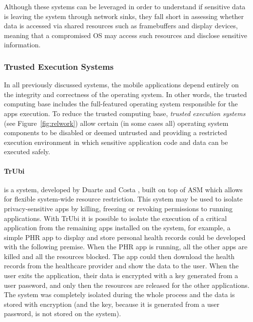 Although these systems can be leveraged in order to understand if sensitive data is leaving the system through network sinks, they fall short in assessing whether data is accessed via shared resources such as framebuffers and display devices, meaning that a compromised OS may access such resources and disclose sensitive information.

\subsubsection{Trusted Execution Systems}
\label{sec:tee}

In all previously discussed systems, the mobile applications depend entirely on the integrity and correctness of the operating system. In other words, the trusted computing base includes the full-featured operating system responsible for the apps execution. To reduce the trusted computing base, \emph{trusted execution systems} (see Figure~\ref{fig:relwork}) allow certain (in some cases all) operating system components to be disabled or deemed untrusted and providing a restricted execution environment in which sensitive application code and data can be executed safely.

\paragraph{\textbf{TrUbi}} is a system, developed by Duarte \cite{nunoduarte} and Costa \cite{miguelcosta}, built on top of ASM \cite{heuser2014asm} which allows for flexible system-wide resource restriction. This system may be used to isolate privacy-sensitive apps by killing, freezing or revoking permissions to running applications. With TrUbi it is possible to isolate the execution of a critical application from the remaining apps installed on the system, for example, a simple \ac{PHR} app to display and store personal health records could be developed with the following premise. When the \ac{PHR} app is running, all the other apps are killed and all the resources blocked. The app could then download the health records from the healthcare provider and show the data to the user. When the user exits the application, their data is encrypted with a key generated from a user password, and only then the resources are released for the other applications. The system was completely isolated during the whole process and the data is stored with encryption (and the key, because it is generated from a user password, is not stored on the system).

